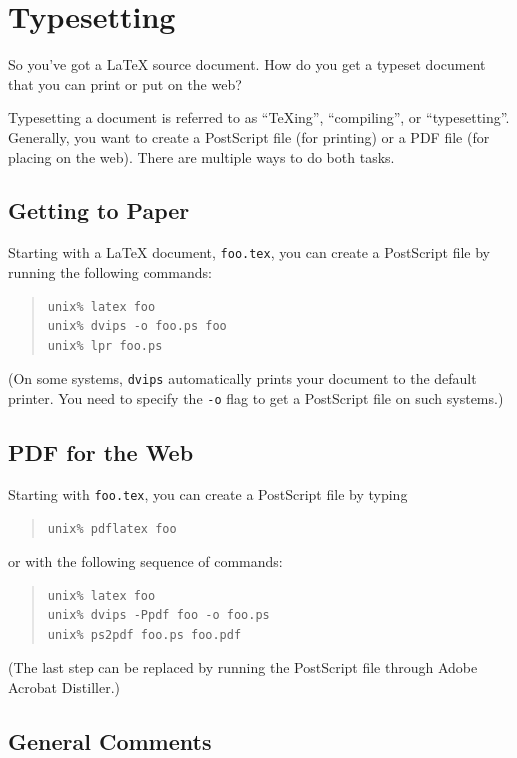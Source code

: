 \documentclass{icmmcm}
\newcommand{\file}[1]{\texttt{#1}\xspace}
\newcommand{\prog}[1]{\texttt{#1}\xspace}
\newcommand{\tex}{\TeX\xspace}
\newcommand{\latex}{\LaTeX\xspace}
\begin{document}
{\section{Typesetting}%
\label{sec:typesetting}

So you've got a \latex source document.  How do you get a typeset
document that you can print or put on the web?

Typesetting a document is referred to as ``\tex{}ing'', ``compiling'',
or ``typesetting''.  Generally, you want to create a PostScript file
(for printing) or a PDF file (for placing on the web).  There are
multiple ways to do both tasks.


\subsection{Getting to Paper}

Starting with a \latex document, \file{foo.tex}, you can create a
PostScript file by running the following commands:
\begin{quote}
\begin{verbatim}
unix% latex foo
unix% dvips -o foo.ps foo
unix% lpr foo.ps
\end{verbatim}
\end{quote}
(On some systems, \prog{dvips} automatically prints your document to
the default printer.  You need to specify the \prog{-o} flag to get a
PostScript file on such systems.)


\subsection{PDF for the Web}

Starting with \file{foo.tex}, you can create a PostScript file by
typing
\begin{quote}
\begin{verbatim}
unix% pdflatex foo
\end{verbatim}
\end{quote}
or with the following sequence of commands:
\begin{quote}
\begin{verbatim}
unix% latex foo
unix% dvips -Ppdf foo -o foo.ps
unix% ps2pdf foo.ps foo.pdf
\end{verbatim}
\end{quote}
(The last step can be replaced by running the PostScript file through
Adobe Acrobat Distiller.)


\subsection{General Comments}

}
\end{document}
